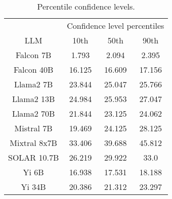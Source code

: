 \begin{table*}
\centering
\begin{tabular}{c|c|c|c}
& \multicolumn{3}{c}{Confidence level percentiles} \\ 
LLM & 10th & 50th & 90th\\ \hline
Falcon 7B & 1.793 & 2.094 & 2.395\\
Falcon 40B & 16.125 & 16.609 & 17.156\\
Llama2 7B & 23.844 & 25.047 & 25.766\\
Llama2 13B & 24.984 & 25.953 & 27.047\\
Llama2 70B & 21.844 & 23.125 & 24.062\\
Mistral 7B & 19.469 & 24.125 & 28.125\\
Mixtral 8x7B & 33.406 & 39.688 & 45.812\\
SOLAR 10.7B & 26.219 & 29.922 & 33.0\\
Yi 6B & 16.938 & 17.531 & 18.188\\
Yi 34B & 20.386 & 21.312 & 23.297\\
\hline
\end{tabular}
\caption{Percentile confidence levels.}
\label{tab:percentile_conf}
\end{table*}
